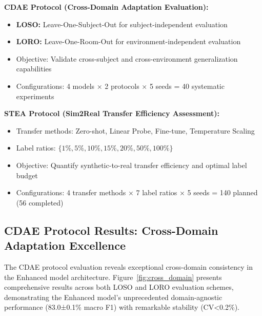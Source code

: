 \documentclass[journal]{IEEEtran}
\begin{document}
\textbf{CDAE Protocol (Cross-Domain Adaptation Evaluation):}
\begin{itemize}
\item \textbf{LOSO:} Leave-One-Subject-Out for subject-independent evaluation
\item \textbf{LORO:} Leave-One-Room-Out for environment-independent evaluation
\item Objective: Validate cross-subject and cross-environment generalization capabilities
\item Configurations: 4 models × 2 protocols × 5 seeds = 40 systematic experiments
\end{itemize}

\textbf{STEA Protocol (Sim2Real Transfer Efficiency Assessment):}
\begin{itemize}
\item Transfer methods: Zero-shot, Linear Probe, Fine-tune, Temperature Scaling
\item Label ratios: $\{1\%, 5\%, 10\%, 15\%, 20\%, 50\%, 100\%\}$
\item Objective: Quantify synthetic-to-real transfer efficiency and optimal label budget
\item Configurations: 4 transfer methods × 7 label ratios × 5 seeds = 140 planned (56 completed)
\end{itemize}

\subsection{CDAE Protocol Results: Cross-Domain Adaptation Excellence}

The CDAE protocol evaluation reveals exceptional cross-domain consistency in the Enhanced model architecture. Figure~\ref{fig:cross_domain} presents comprehensive results across both LOSO and LORO evaluation schemes, demonstrating the Enhanced model's unprecedented domain-agnostic performance (83.0±0.1\% macro F1) with remarkable stability (CV<0.2\%).
\end{document}
